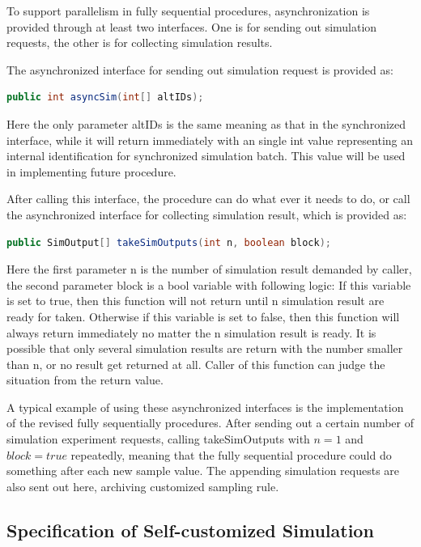 \documentclass[12pt,a4paper]{report}
\begin{document}
To support parallelism in fully sequential procedures, asynchronization is provided through at least two interfaces. One is for sending out simulation requests, the other is for collecting simulation results.

The asynchronized interface for sending out simulation request is provided as:

\begin{lstlisting}[language=Java]
public int asyncSim(int[] altIDs);
\end{lstlisting}

Here the only parameter altIDs is the same meaning as that in the synchronized interface, while it will return immediately with an single int value representing an internal identification for synchronized simulation batch. This value will be used in implementing future procedure.

After calling this interface, the procedure can do what ever it needs to do, or call the asynchronized interface for collecting simulation result, which is provided as:

\begin{lstlisting}[language=Java]
public SimOutput[] takeSimOutputs(int n, boolean block);
\end{lstlisting}

Here the first parameter n is the number of simulation result demanded by caller, the second parameter block is a bool variable with following logic: If this variable is set to true, then this function will not return until n simulation result are ready for taken. Otherwise if this variable  is set to false, then this function will always return immediately no matter the n simulation result is ready. It is possible that only several simulation results are return with the number smaller than n, or no result get returned at all. Caller of this function can judge the situation from the return value.

A typical example of using these asynchronized interfaces is the implementation of the revised fully sequentially procedures. After sending out a certain number of simulation experiment requests, calling takeSimOutputs with $n = 1$ and $block = true$ repeatedly, meaning that the fully sequential procedure could do something after each new sample value. The appending simulation requests are also sent out here, archiving customized sampling rule.

\subsection{Specification of Self-customized Simulation}
\end{document}
